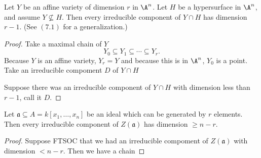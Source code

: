 \begin{exercise}%
Let $Y$ be an affine variety of dimension $r$ in $\A^n$. Let $H$ be a hypersurface in $\A^n$, and assume $Y \not\subseteq H$. Then every irreducible component of $Y \cap H$ has dimension $r-1$. (See $(7.1)$ for a generalization.)
\end{exercise}
\begin{proof}
	Take a maximal chain of $Y$
	\[
		Y_{0}\subseteq Y_{1}\subseteq \cdots \subseteq Y_r
	.\] 
	Because $Y $ is an affine variety, $Y_r = Y $ and because this is in $\A^n $, $Y_{0} $ is a point.
	Take an irreducible compoment $D $ of $Y\cap H $

	Suppose there was an irreducible component of $Y \cap H $ with dimension less than $r-1 $, call it $D $.
\end{proof}

\begin{exercise}%
Let $\mathfrak{a} \subseteq A = k[x_1,\ldots,x_n]$ be an ideal which can be generated by $r$ elements. Then every irreducible component of $Z(\mathfrak{a})$ has dimension $\ge n-r$.
\end{exercise}
\begin{proof}
	Suppose FTSOC that we had an irreducible compoment of $Z(\mathfrak{a}) $ with dimension $< n-r $.
	Then we have a chain 
\end{proof}

